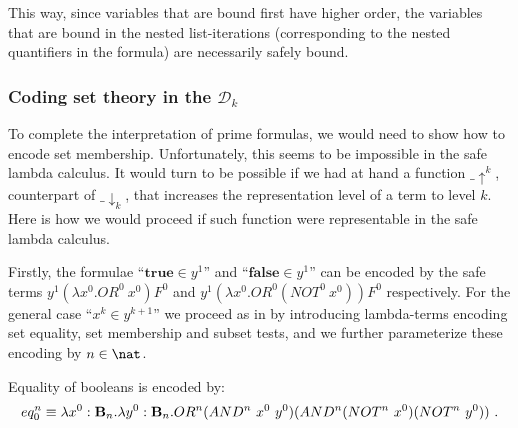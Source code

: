 This way, since variables that are bound first have higher order, the variables
 that are bound in the nested list-iterations (corresponding to the nested quantifiers in the formula) are necessarily safely bound.


\subsubsection{Coding set theory in the $\mathcal{D}_k$}
To complete the interpretation of prime formulas, we would need to show how to encode set membership. Unfortunately, this seems to be impossible in the safe lambda calculus. It would turn to be possible if we had at hand a function $\_ \uparrow^k$, counterpart of $\_ \downarrow_k$, that increases the representation level of a term to level $k$. Here is how we would proceed if such function were representable in the safe lambda calculus.

Firstly, the formulae ``$\mathbf{true} \in y^1$'' and ``$\mathbf{false} \in y^1$'' can be encoded by the safe terms $y^1 (\lambda x^0 . OR^0~x^0) F^0$ and $y^1 (\lambda x^0. OR^0(NOT^0~x^0)) F^0$ respectively.
For the general case ``$x^k\in y^{k+1}$''
we proceed as in \cite{mairson1992spt} by introducing lambda-terms encoding set equality, set membership and subset tests, and we further parameterize these encoding by $n\in\nat$.

Equality of booleans is encoded by:
$$ eq_0^n \equiv \lambda x^0 : \booltype_n .\lambda y^0 : \booltype_n. OR^n (AND^n~x^0~y^0) (AND^n (NOT^n~x^0)(NOT^n~y^0)) \ .$$

